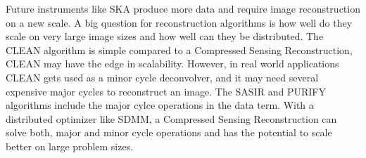 Future instruments like SKA produce more data and require image reconstruction on a new scale. A big question for reconstruction algorithms is how well do they scale on very large image sizes and how well can they be distributed. The CLEAN algorithm is simple compared to a Compressed Sensing Reconstruction, CLEAN may have the edge in scalability. However, in real world applications CLEAN gets used as a minor cycle deconvolver, and it may need several expensive major cycles to reconstruct an image. The SASIR and PURIFY algorithms include the major cylce operations in the data term. With a distributed optimizer like SDMM, a Compressed Sensing Reconstruction can solve both, major and minor cycle operations and has the potential to scale better on large problem sizes.






 

